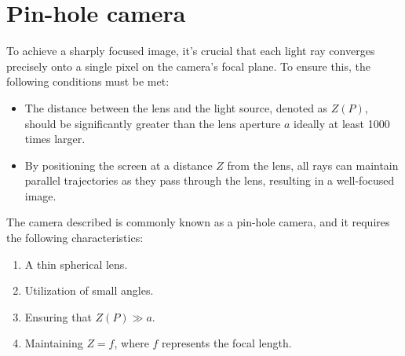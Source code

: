 \section{Pin-hole camera}

To achieve a sharply focused image, it's crucial that each light ray converges precisely onto a single pixel on the camera's focal plane. 
To ensure this, the following conditions must be met:
\begin{itemize}
    \item The distance between the lens and the light source, denoted as $Z(P)$, should be significantly greater than the lens aperture $a$ ideally at least 1000 times larger.
    \item By positioning the screen at a distance $Z$ from the lens, all rays can maintain parallel trajectories as they pass through the lens, resulting in a well-focused image.
\end{itemize}
The camera described is commonly known as a pin-hole camera, and it requires the following characteristics:
\begin{enumerate}
    \item A thin spherical lens.
    \item Utilization of small angles.
    \item Ensuring that $Z(P) \gg a$.
    \item Maintaining $Z=f$, where $f$ represents the focal length.
\end{enumerate}